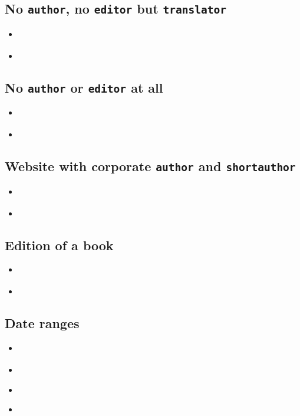 \documentclass[a4paper,12pt]{scrartcl}
\newcommand*{\Feld}[1]{\texttt{#1}}
\begin{document}
\subsection{No \Feld{author}, no \Feld{editor} but \Feld{translator}}
\begin{itemize}
    \item\cite{sterk:1777}%
    \item{}%
\end{itemize}

\subsection{No \Feld{author} or \Feld{editor} at all}
\begin{itemize}
    \item\cite{domino:1780}%
    \item{}%
\end{itemize}

\subsection{Website with corporate \Feld{author} and \Feld{shortauthor}}
\begin{itemize}
    \item\cite{kenmore}%
    \item{}%
\end{itemize}

\subsection{Edition of a book}
\begin{itemize}
    \item\cite{fuchs:kh:et:al:1998}%
    \item{}%
\end{itemize}

\subsection{Date ranges}
\begin{itemize}
    \item\cite{bhattacharyya:1973}%
    \item{}%
    \item\cite{cossel:1933-35}%
    \item{}%
\end{itemize}
\end{document}
